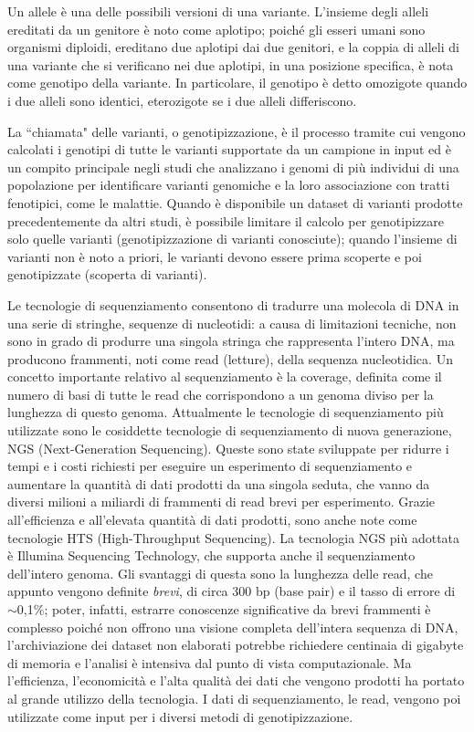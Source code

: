 \documentclass[../main.tex]{subfiles}
\begin{document}
Un allele è una delle possibili versioni di una variante. L'insieme degli alleli ereditati da un genitore è noto come aplotipo; poiché gli esseri umani sono organismi diploidi, ereditano due aplotipi dai due genitori, e la coppia di alleli di una variante che si verificano nei due aplotipi, in una posizione specifica, è nota come genotipo della variante. In particolare, il genotipo è detto omozigote quando i due alleli sono identici, eterozigote se i due alleli differiscono. 

La ``chiamata" delle varianti, o genotipizzazione, è il processo tramite cui vengono calcolati i genotipi di tutte le varianti supportate da un campione in input ed è un compito principale negli studi che analizzano i genomi di più individui di una popolazione per identificare varianti genomiche e la loro associazione con tratti fenotipici, come le malattie. Quando è disponibile un dataset di varianti prodotte precedentemente da altri studi, è possibile limitare il calcolo per genotipizzare solo quelle varianti (genotipizzazione di varianti conosciute); quando l'insieme di varianti non è noto a priori, le varianti devono essere prima scoperte e poi genotipizzate (scoperta di varianti).

Le tecnologie di sequenziamento consentono di tradurre una molecola di DNA in una serie di stringhe, sequenze di nucleotidi: a causa di limitazioni tecniche, non sono in grado di produrre una singola stringa che rappresenta l'intero DNA, ma producono frammenti, noti come read (letture), della sequenza nucleotidica. Un concetto importante relativo al sequenziamento è la coverage, definita come il numero di basi di tutte le read che corrispondono a un genoma diviso per la lunghezza di questo genoma. Attualmente le tecnologie di sequenziamento più utilizzate sono le cosiddette tecnologie di sequenziamento di nuova generazione, NGS (Next-Generation Sequencing). Queste sono state sviluppate per ridurre i tempi e i costi richiesti per eseguire un esperimento di sequenziamento e aumentare la quantità di dati prodotti da una singola seduta, che vanno da diversi milioni a miliardi di frammenti di read brevi per esperimento. Grazie all'efficienza e all'elevata quantità di dati prodotti, sono anche note come tecnologie HTS (High-Throughput Sequencing). La tecnologia NGS più adottata è Illumina Sequencing Technology, che  supporta anche il sequenziamento dell'intero genoma. Gli svantaggi di questa sono la lunghezza delle read, che appunto vengono definite \textit{brevi}, di circa 300 bp (base pair) e il tasso di errore di  $\sim$0,1\%; poter, infatti, estrarre conoscenze significative da brevi frammenti è complesso poiché non offrono una visione completa dell'intera sequenza di DNA, l'archiviazione dei dataset non elaborati potrebbe richiedere centinaia di gigabyte di memoria e l'analisi è intensiva dal punto di vista computazionale. Ma l'efficienza, l'economicità e l'alta qualità dei dati che vengono prodotti ha portato al grande utilizzo della tecnologia. I dati di sequenziamento, le read, vengono poi utilizzate come input per i diversi metodi di genotipizzazione.
\end{document}
